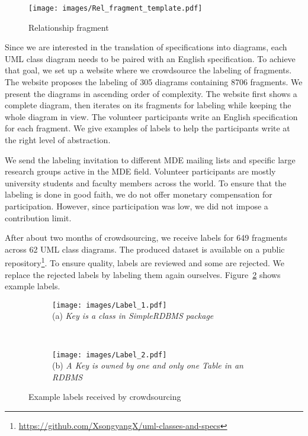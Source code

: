 \documentclass[sigconf]{acmart}
\begin{document}
\begin{figure}
    \centering
    \texttt{[image: images/Rel\_fragment\_template.pdf]}
    \caption{Relationship fragment}
    \label{fig:rel_fragment}
\end{figure}

Since we are interested in the translation of specifications into diagrams, each UML class diagram needs to be paired with an English specification. To achieve that goal, we set up a website where we crowdsource the labeling of fragments. The website proposes the labeling of 305 diagrams containing 8706 fragments. We present the diagrams in ascending order of complexity. The website first shows a complete diagram, then iterates on its fragments for labeling while keeping the whole diagram in view. The volunteer participants write an English specification for each fragment. We give examples of labels to help the participants write at the right level of abstraction.

We send the labeling invitation to different MDE mailing lists and specific large research groups active in the MDE field. Volunteer participants are mostly university students and faculty members across the world. To ensure that the labeling is done in good faith, we do not offer monetary compensation for participation. However, since participation was low, we did not impose a contribution limit.

After about two months of crowdsourcing, we receive labels for 649 fragments across 62 UML class diagrams. The produced dataset is available on a public repository\footnote{\url{https://github.com/XsongyangX/uml-classes-and-specs}}. 
To ensure quality, labels are reviewed and some are rejected. We replace the rejected labels by labeling them again ourselves. Figure~\ref{fig:label_sample} shows example labels.

\begin{figure}[h]
    \centering
    
    \begin{subfigure}
        \centering
        \texttt{[image: images/Label\_1.pdf]}\\
        (a) \textit{Key is a class in SimpleRDBMS package}
    \end{subfigure}
    \newline \\
    \begin{subfigure}
        \centering
        \texttt{[image: images/Label\_2.pdf]}\\
        (b) \textit{A Key is owned by one and only one Table in an RDBMS}
    \end{subfigure}
    \caption{Example labels received by crowdsourcing}
    \label{fig:label_sample}
\end{figure}
\end{document}

